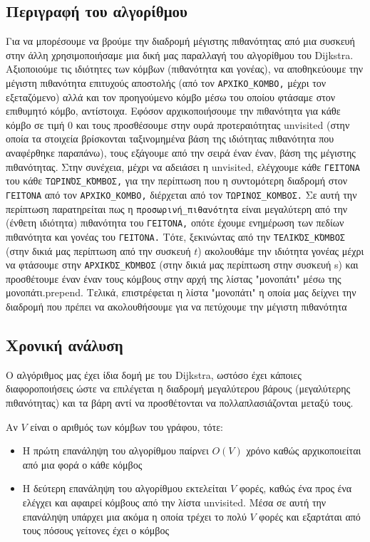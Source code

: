 \documentclass[11pt]{article}
\begin{document}
\subsection{Περιγραφή του αλγορίθμου}
\label{sec:org6d7d419}
Για να μπορέσουμε να βρούμε την διαδρομή μέγιστης πιθανότητας από μια συσκευή
στην άλλη χρησιμοποιήσαμε μια δική μας παραλλαγή του αλγορίθμου του Dijkstra.
Αξιοποιούμε τις ιδιότητες των κόμβων (πιθανότητα και γονέας), να αποθηκεύουμε
την μέγιστη πιθανότητα επιτυχούς αποστολής (από τον \texttt{ΑΡΧΙΚΟ\_ΚΟΜΒΟ,} μέχρι τον
εξεταζόμενο) αλλά και τον προηγούμενο κόμβο μέσω του οποίου φτάσαμε στον
επιθυμητό κόμβο, αντίστοιχα. Εφόσον αρχικοποιήσουμε την πιθανότητα για κάθε
κόμβο σε τιμή 0 και τους προσθέσουμε στην ουρά προτεραιότητας unvisited (στην
οποία τα στοιχεία βρίσκονται ταξινομημένα βάση της ιδιότητας πιθανότητα που
αναφέρθηκε παραπάνω), τους εξάγουμε από την σειρά έναν έναν, βάση της μέγιστης
πιθανότητας. Στην συνέχεια, μέχρι να αδειάσει η unvisited, ελέγχουμε κάθε
\texttt{ΓΕΙΤΟΝΑ} του κάθε \texttt{ΤΩΡΙΝΌΣ\_ΚΌΜΒΟΣ,} για την περίπτωση που η συντομότερη διαδρομή
στον \texttt{ΓΕΙΤΟΝΑ} από τον \texttt{ΑΡΧΙΚΟ\_ΚΟΜΒΟ,} διέρχεται από τον \texttt{ΤΩΡΙΝΟΣ\_ΚΟΜΒΟΣ.} Σε αυτή την
περίπτωση παρατηρείται πως η \texttt{προσωρινή\_πιθανότητα} είναι μεγαλύτερη από την
(ένθετη ιδιότητα) πιθανότητα του \texttt{ΓΕΙΤΟΝΑ,} οπότε έχουμε ενημέρωση των πεδίων
πιθανότητα και γονέας του \texttt{ΓΕΙΤΟΝΑ.} Τότε, ξεκινώντας από την \texttt{ΤΕΛΙΚΌΣ\_ΚΌΜΒΟΣ} (στην
δικιά μας περίπτωση από την συσκευή \(t\)) ακολουθάμε την ιδιότητα γονέας μέχρι να
φτάσουμε στην \texttt{ΑΡΧΙΚΌΣ\_ΚΌΜΒΟΣ} (στην δικιά μας περίπτωση στην συσκευή s) και
προσθέτουμε έναν έναν τους κόμβους στην αρχή της λίστας "μονοπάτι" μέσω της
μονοπάτι.prepend. Τελικά, επιστρέφεται η λίστα "μονοπάτι" η οποία μας δείχνει
την διαδρομή που πρέπει να ακολουθήσουμε για να πετύχουμε την μέγιστη πιθανότητα
\subsection{Χρονική ανάλυση}
\label{sec:org740a4c0}
Ο αλγόριθμος μας έχει ίδια δομή με του Dijkstra, ωστόσο έχει κάποιες
διαφοροποιήσεις ώστε να επιλέγεται η διαδρομή μεγαλύτερου βάρους (μεγαλύτερης
πιθανότητας) και τα βάρη αντί να προσθέτονται να πολλαπλασιάζονται μεταξύ τους.

Αν \(V\) είναι ο αριθμός των κόμβων του γράφου, τότε:
\begin{itemize}
\item Η πρώτη επανάληψη του αλγορίθμου παίρνει \(O(V)\) χρόνο καθώς αρχικοποιείται από
μια φορά ο κάθε κόμβος
\item Η δεύτερη επανάληψη του αλγορίθμου εκτελείται \(V\) φορές, καθώς ένα προς ένα
ελέγχει και αφαιρεί κόμβους από την λίστα unvisited. Μέσα σε αυτή την
επανάληψη υπάρχει μια ακόμα η οποία τρέχει το πολύ \(V\) φορές και εξαρτάται από
τους πόσους γείτονες έχει ο κόμβος
\end{itemize}
\end{document}
